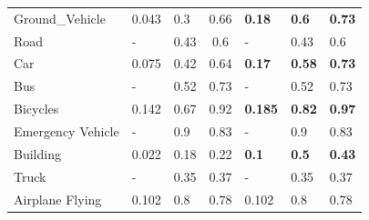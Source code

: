 \begin{table}[h]
\begin{tabular}{lp{1.2cm}p{1.2cm}p{1.2cm}p{1.2cm}p{1.2cm}p{1.2cm}}
\multicolumn{1}{l|}{Ground\_Vehicle}                                     & 0.043                     & 0.3                      & \multicolumn{1}{c|}{0.66}                & \textbf{0.18}                      & \textbf{0.6}                      & \textbf{0.73}                     \\
\multicolumn{1}{l|}{Road}                                                & -                         & 0.43                     & \multicolumn{1}{c|}{0.6}                 & -                                  & 0.43                              & 0.6                               \\
\multicolumn{1}{l|}{Car}                                                 & 0.075                     & 0.42                     & \multicolumn{1}{c|}{0.64}                & \textbf{0.17}                      & \textbf{0.58}                     & \textbf{0.73}                     \\
\multicolumn{1}{l|}{Bus}                                                 & -                         & 0.52                     & \multicolumn{1}{c|}{0.73}                & -                                  & 0.52                              & 0.73                              \\
\multicolumn{1}{l|}{Bicycles}                                            & 0.142                     & 0.67                     & \multicolumn{1}{c|}{0.92}                & \textbf{0.185}                     & \textbf{0.82}                     & \textbf{0.97}                     \\
\multicolumn{1}{l|}{Emergency Vehicle}                                   & -                         & 0.9                      & \multicolumn{1}{c|}{0.83}                & -                                  & 0.9                               & 0.83                              \\
\multicolumn{1}{l|}{Building}                                            & 0.022                     & 0.18                     & \multicolumn{1}{c|}{0.22}                & \textbf{0.1}                       & \textbf{0.5}                      & \textbf{0.43}                     \\
\multicolumn{1}{l|}{Truck}                                               & -                         & 0.35                     & \multicolumn{1}{c|}{0.37}                & -                                  & 0.35                              & 0.37                              \\
\multicolumn{1}{l|}{Airplane Flying}                                     & 0.102                     & 0.8                      & \multicolumn{1}{c|}{0.78}                & 0.102                              & 0.8                               & 0.78                              \\

\end{tabular}
\end{table}
